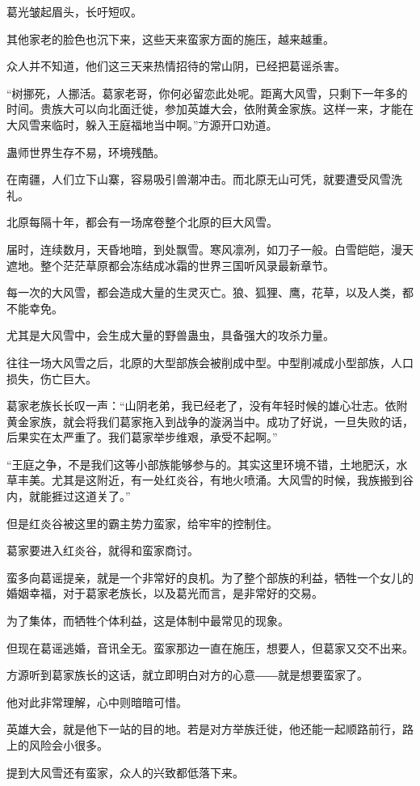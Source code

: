 \begin{this_body}
葛光皱起眉头，长吁短叹。

其他家老的脸色也沉下来，这些天来蛮家方面的施压，越来越重。

众人并不知道，他们这三天来热情招待的常山阴，已经把葛谣杀害。

“树挪死，人挪活。葛家老哥，你何必留恋此处呢。距离大风雪，只剩下一年多的时间。贵族大可以向北面迁徙，参加英雄大会，依附黄金家族。这样一来，才能在大风雪来临时，躲入王庭福地当中啊。”方源开口劝道。

蛊师世界生存不易，环境残酷。

在南疆，人们立下山寨，容易吸引兽潮冲击。而北原无山可凭，就要遭受风雪洗礼。

北原每隔十年，都会有一场席卷整个北原的巨大风雪。

届时，连续数月，天昏地暗，到处飘雪。寒风凛冽，如刀子一般。白雪皑皑，漫天遮地。整个茫茫草原都会冻结成冰霜的世界三国听风录最新章节。

每一次的大风雪，都会造成大量的生灵灭亡。狼、狐狸、鹰，花草，以及人类，都不能幸免。

尤其是大风雪中，会生成大量的野兽蛊虫，具备强大的攻杀力量。

往往一场大风雪之后，北原的大型部族会被削成中型。中型削减成小型部族，人口损失，伤亡巨大。

葛家老族长长叹一声：“山阴老弟，我已经老了，没有年轻时候的雄心壮志。依附黄金家族，就会将我们葛家拖入到战争的漩涡当中。成功了好说，一旦失败的话，后果实在太严重了。我们葛家举步维艰，承受不起啊。”

“王庭之争，不是我们这等小部族能够参与的。其实这里环境不错，土地肥沃，水草丰美。尤其是这附近，有一处红炎谷，有地火喷涌。大风雪的时候，我族搬到谷内，就能捱过这道关了。”

但是红炎谷被这里的霸主势力蛮家，给牢牢的控制住。

葛家要进入红炎谷，就得和蛮家商讨。

蛮多向葛谣提亲，就是一个非常好的良机。为了整个部族的利益，牺牲一个女儿的婚姻幸福，对于葛家老族长，以及葛光而言，是非常好的交易。

为了集体，而牺牲个体利益，这是体制中最常见的现象。

但现在葛谣逃婚，音讯全无。蛮家那边一直在施压，想要人，但葛家又交不出来。

方源听到葛家族长的这话，就立即明白对方的心意――就是想要蛮家了。

他对此非常理解，心中则暗暗可惜。

英雄大会，就是他下一站的目的地。若是对方举族迁徙，他还能一起顺路前行，路上的风险会小很多。

提到大风雪还有蛮家，众人的兴致都低落下来。


\end{this_body}

